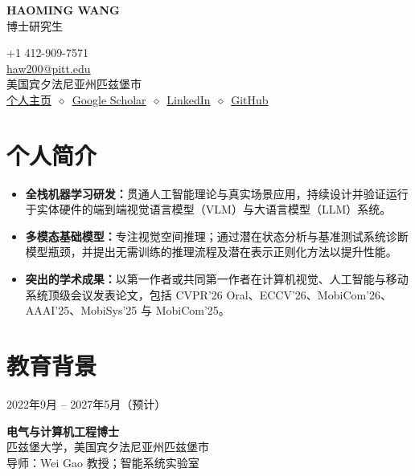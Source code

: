 \documentclass[10pt,letterpaper,fontset=fandol]{ctexart}
\newenvironment{datedentry}[1]{%
  \par\noindent
  \begin{minipage}[t]{3.0cm}\raggedright\small #1\end{minipage}%
  \hspace{0.25cm}%
  \begin{minipage}[t]{\dimexpr\linewidth-3.25cm\relax}\raggedright
}{\end{minipage}\par\vspace{3pt}}
\begin{document}
\noindent
\begin{minipage}[t]{0.57\linewidth}
  \vspace{0pt}
  {\fontsize{23pt}{25pt}\selectfont\sffamily\textbf{HAOMING WANG}}\\[2pt]
  {\sffamily\normalsize 博士研究生}
\end{minipage}%
\begin{minipage}[t]{0.43\linewidth}
  \vspace{0pt}
  \raggedleft\small
  +1 412-909-7571 \\
  \href{mailto:haw200@pitt.edu}{haw200@pitt.edu} \\
  美国宾夕法尼亚州匹兹堡市 \\[2pt]
  \href{https://haomingwang645.github.io/}{个人主页}\ $\diamond$\ \href{https://scholar.google.com.hk/citations?user=bf6LCjUAAAAJ}{Google Scholar}\ $\diamond$\ \href{https://www.linkedin.com/in/haoming-wang-40a6a7239/}{LinkedIn}\ $\diamond$\ \href{https://github.com/HaomingWang645}{GitHub}
\end{minipage}

\section{个人简介}
\begin{itemize}[leftmargin=1.1em,itemsep=1.5pt,topsep=2pt]
  \item \textbf{全栈机器学习研发：}贯通人工智能理论与真实场景应用，持续设计并验证运行于实体硬件的端到端视觉语言模型（VLM）与大语言模型（LLM）系统。
  \item \textbf{多模态基础模型：}专注视觉空间推理；通过潜在状态分析与基准测试系统诊断模型瓶颈，并提出无需训练的推理流程及潜在表示正则化方法以提升性能。
  \item \textbf{突出的学术成果：}以第一作者或共同第一作者在计算机视觉、人工智能与移动系统顶级会议发表论文，包括 CVPR'26 Oral、ECCV'26、MobiCom'26、AAAI'25、MobiSys'25 与 MobiCom'25。
\end{itemize}

\section{教育背景}

\begin{datedentry}{2022年9月 -- 2027年5月（预计）}
\textbf{电气与计算机工程博士}\\
匹兹堡大学，美国宾夕法尼亚州匹兹堡市\\
导师：Wei Gao 教授；智能系统实验室
\end{datedentry}
\end{document}
